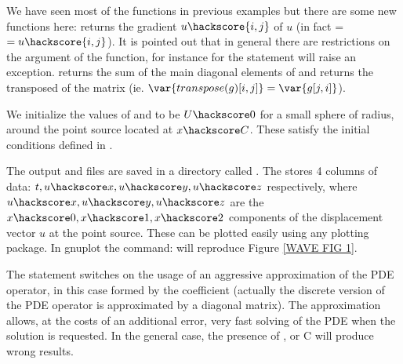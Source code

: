 We have seen most of the functions in previous examples but there are some new functions here: 
 returns the gradient $u\hackscore{i,j}$ of $u$ (in fact =$=u\hackscore{i,j}$).
It is pointed out that in general there are restrictions on the argument of the  function, for instance
for \finley the statement  will raise an exception.
 returns the sum of the main diagonal elements  of  
and  returns the transposed of the matrix  (ie. 
$\var{transpose(g)[i,j]}=\var{g[j,i]}$). 

We initialize the values of  and  to be $U\hackscore 0$ for a small 
sphere of radius,  around the point source located at $x\hackscore C$.
These satisfy the initial conditions defined in .

The output  and  files are saved in a directory called .
The  stores 4 columns of data: $t,u\hackscore x,u\hackscore y,u\hackscore z$ 
respectively, where $u\hackscore x,u\hackscore y,u\hackscore z$ are the $x\hackscore 0,x\hackscore 1,x\hackscore 2$ components of 
the displacement vector $u$ at the point source. These can be
plotted easily using any plotting package. In gnuplot the command:
 will reproduce Figure \ref{WAVE FIG 1}.

The statement 
switches on the usage of an aggressive approximation of the PDE operator, in this case
formed by the coefficient  (actually the discrete 
version of the PDE operator is approximated by a diagonal matrix). The approximation allows, at the costs of 
an additional error, very fast 
solving of the PDE when the solution is requested. In the general case, the presence of ,  or \var
{C}  will produce wrong results.


